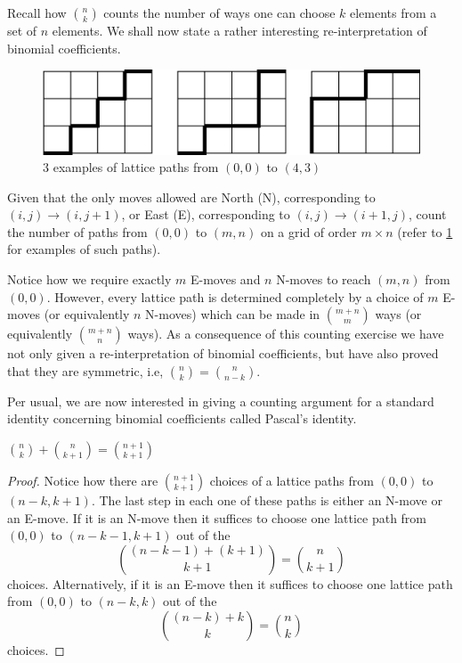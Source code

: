 Recall how $\binom{n}{k}$ counts the number of ways one can choose $k$ elements from a set of $n$ elements. We shall now state a rather interesting re-interpretation of binomial coefficients. 
\begin{figure}[H]
	\centering
	\includegraphics[scale=0.6]{Images/Figure8.png}
	\caption{$3$ examples of lattice paths from $\left( 0,0 \right)$ to $\left( 4,3 \right) $}
	\label{f:1.8}
\end{figure}
\begin{question}
	Given that the only moves allowed are North (N), corresponding to $\left( i,j \right) \to \left( i,j+1 \right)$, or East (E), corresponding to $\left( i,j \right)\to \left( i+1,j \right)$, count the number of paths from $\left( 0,0 \right)$ to $\left( m,n \right)$ on a grid of order $m\times n$ (refer to \cref{f:1.8} for examples of such paths).
\end{question}
Notice how we require exactly $m$ E-moves and $n$ N-moves to reach $\left( m,n \right)$ from $\left( 0,0 \right)$. However, every lattice path is determined completely by a choice of $m$ E-moves (or equivalently $n$ N-moves) which can be made in $\binom{m+n}{m}$ ways (or equivalently $\binom{m+n}{n}$ ways). As a consequence of this counting exercise we have not only given a re-interpretation of binomial coefficients, but have also proved that they are symmetric, i.e, $\binom{n}{k}=\binom{n}{n-k}$.

Per usual, we are now interested in giving a counting argument for a standard identity concerning binomial coefficients called Pascal's identity.
\begin{claim}
	$\binom{n}{k} + \binom{n}{k+1} = \binom{n+1}{k+1}$
\end{claim}
\begin{proof}
	Notice how there are $\binom{n+1}{k+1}$ choices of a lattice paths from $\left( 0,0 \right)$ to $\left( n-k,k+1 \right)$. The last step in each one of these paths is either an N-move or an E-move. If it is an N-move then it suffices to choose one lattice path from $\left( 0,0 \right)$ to $\left( n-k-1,k+1 \right)$ out of the \[
		\binom{\left( n-k-1 \right) + \left( k+1 \right)}{k+1} = \binom{n}{k+1}
	\] choices. Alternatively, if it is an E-move then it suffices to choose one lattice path from $\left( 0,0 \right)$ to $\left( n-k,k \right)$ out of the \[
	\binom{\left( n-k \right) + k}{k} = \binom{n}{k}
	\] choices.
\end{proof}

